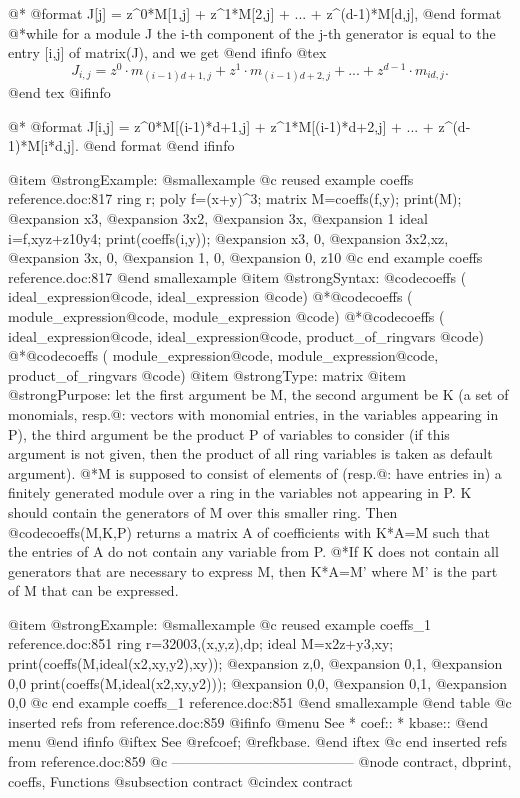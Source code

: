 @*
@format
   J[j] = z^0*M[1,j] + z^1*M[2,j] + ... + z^(d-1)*M[d,j],
@end format
@*while for a module J the i-th component of the j-th generator is
equal to the entry [i,j] of matrix(J), and we get
@end ifinfo
@tex
$$ J_{i,j} = z^0 \cdot m_{(i-1)d+1,j} + z^1 \cdot m_{(i-1)d+2,j} + ... +
z^{d-1} \cdot m_{id,j}.$$
@end tex
@ifinfo

@*
@format
 J[i,j] = z^0*M[(i-1)*d+1,j] + z^1*M[(i-1)*d+2,j] + ...
                             + z^(d-1)*M[i*d,j].
@end format
@end ifinfo

@item @strong{Example:}
@smallexample
@c reused example coeffs reference.doc:817 
  ring r;
  poly f=(x+y)^3;
  matrix M=coeffs(f,y);
  print(M);
@expansion{} x3, 
@expansion{} 3x2,
@expansion{} 3x, 
@expansion{} 1   
  ideal i=f,xyz+z10y4;
  print(coeffs(i,y));
@expansion{} x3, 0, 
@expansion{} 3x2,xz,
@expansion{} 3x, 0, 
@expansion{} 1,  0, 
@expansion{} 0,  z10
@c end example coeffs reference.doc:817
@end smallexample
@item @strong{Syntax:}
@code{coeffs (} ideal_expression@code{,} ideal_expression @code{)}
@*@code{coeffs (} module_expression@code{,} module_expression @code{)}
@*@code{coeffs (} ideal_expression@code{,} ideal_expression@code{,} product_of_ringvars @code{)}
@*@code{coeffs (} module_expression@code{,} module_expression@code{,} product_of_ringvars @code{)}
@item @strong{Type:}
matrix
@item @strong{Purpose:}
let the first argument be M,
the second argument  be K (a set of monomials, resp.@: vectors with monomial
entries, in the variables appearing in P),
the third argument be the product P of variables to consider (if this
argument is not given, then the product of all ring variables is taken
as default argument).
@*M is supposed to consist of elements of (resp.@: have entries in)
a finitely generated module
over a ring in the variables not appearing in P. K should contain the
generators of M over this smaller ring.
Then @code{coeffs(M,K,P)} returns a matrix A of coefficients with K*A=M
such that the entries of A do not contain any variable from P.
@*If K does not contain all generators that are necessary to express
M, then K*A=M' where M' is the part of M that can be expressed.

@item @strong{Example:}
@smallexample
@c reused example coeffs_1 reference.doc:851 
  ring r=32003,(x,y,z),dp;
  ideal M=x2z+y3,xy;
  print(coeffs(M,ideal(x2,xy,y2),xy));
@expansion{} z,0,
@expansion{} 0,1,
@expansion{} 0,0 
  print(coeffs(M,ideal(x2,xy,y2)));
@expansion{} 0,0,
@expansion{} 0,1,
@expansion{} 0,0 
@c end example coeffs_1 reference.doc:851
@end smallexample
@end table
@c inserted refs from reference.doc:859
@ifinfo
@menu
See
* coef::
* kbase::
@end menu
@end ifinfo
@iftex
See
@ref{coef};
@ref{kbase}.
@end iftex
@c end inserted refs from reference.doc:859
@c ---------------------------------------
@node contract, dbprint, coeffs, Functions
@subsection contract
@cindex contract

